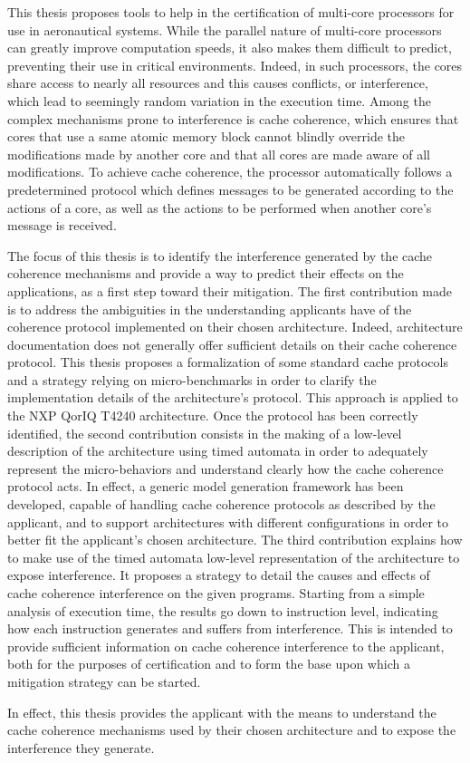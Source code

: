 This thesis proposes tools to help in the certification of multi-core
processors for use in aeronautical systems. While the parallel nature of
multi-core processors can greatly improve computation speeds, it also makes
them difficult to predict, preventing their use in critical environments.
Indeed, in such processors, the cores share access to nearly all resources and
this causes conflicts, or interference, which lead to seemingly random
variation in the execution time. Among the complex mechanisms prone to
interference is cache coherence, which ensures that cores that use a same
atomic memory block cannot blindly override the modifications made by another
core and that all cores are made aware of all modifications. To achieve cache
coherence, the processor automatically follows a predetermined protocol which
defines messages to be generated according to the actions of a core, as well as
the actions to be performed when another core’s message is received.


The focus of this thesis is to identify the interference generated by the cache
coherence mechanisms and provide a way to predict their effects on the
applications, as a first step toward their mitigation. The first contribution
made is to address the ambiguities in the understanding applicants have of the
coherence protocol implemented on their chosen architecture. Indeed,
architecture documentation does not generally offer sufficient details on their
cache coherence protocol. This thesis proposes a formalization of some standard
cache protocols and a strategy relying on micro-benchmarks in order to clarify
the implementation details of the architecture’s protocol. This approach is
applied to the NXP QorIQ T4240 architecture. Once the protocol has been
correctly identified, the second contribution consists in the making of a
low-level description of the architecture using timed automata in order to
adequately represent the micro-behaviors and understand clearly how the cache
coherence protocol acts. In effect, a generic model generation framework has
been developed, capable of handling cache coherence protocols as described by
the applicant, and to support architectures with different configurations in
order to better fit the applicant’s chosen architecture. The third contribution
explains how to make use of the timed automata low-level representation of the
architecture to expose interference. It proposes a strategy to detail the
causes and effects of cache coherence interference on the given programs.
Starting from a simple analysis of execution time, the results go down to
instruction level, indicating how each instruction generates and suffers from
interference. This is intended to provide sufficient information on cache
coherence interference to the applicant, both for the purposes of certification
and to form the base upon which a mitigation strategy can be started.

In effect, this thesis provides the applicant with the means to understand the
cache coherence mechanisms used by their chosen architecture and to expose the
interference they generate.
